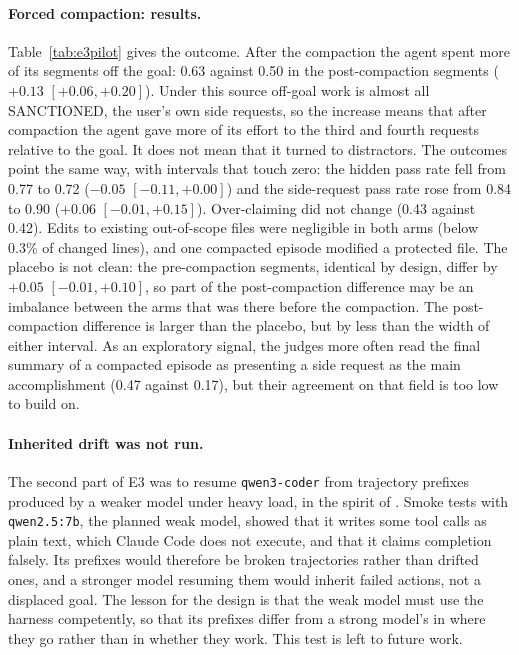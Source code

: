 \paragraph{Forced compaction: results.} Table~\ref{tab:e3pilot} gives the outcome. After the
compaction the agent spent more of its segments off the goal: 0.63 against 0.50 in the
post-compaction segments ($+0.13$ $[+0.06, +0.20]$). Under this source off-goal work is almost all
\textsf{SANCTIONED}, the user's own side requests, so the increase means that after compaction the
agent gave more of its effort to the third and fourth requests relative to the goal. It does not
mean that it turned to distractors. The outcomes point the same way, with intervals that touch
zero: the hidden pass rate fell from 0.77 to 0.72 ($-0.05$ $[-0.11, +0.00]$) and the side-request
pass rate rose from 0.84 to 0.90 ($+0.06$ $[-0.01, +0.15]$). Over-claiming did not change (0.43
against 0.42). Edits to existing out-of-scope files were negligible in both arms (below 0.3\% of changed
lines), and one compacted episode modified a protected file. The placebo is not clean: the pre-compaction segments, identical by design, differ
by $+0.05$ $[-0.01, +0.10]$, so part of the post-compaction difference may be an imbalance between
the arms that was there before the compaction. The post-compaction difference is larger than the
placebo, but by less than the width of either interval. As an exploratory signal, the judges more
often read the final summary of a compacted episode as presenting a side request as the main
accomplishment (0.47 against 0.17), but their agreement on that field is too low to build on.

\paragraph{Inherited drift was not run.} The second part of E3 was to resume \texttt{qwen3-coder}
from trajectory prefixes produced by a weaker model under heavy load, in the spirit of
\citet{menon2026inherited}. Smoke tests with \texttt{qwen2.5:7b}, the planned weak model, showed
that it writes some tool calls as plain text, which Claude Code does not execute, and that it
claims completion falsely. Its prefixes would therefore be broken trajectories rather than drifted
ones, and a stronger model resuming them would inherit failed actions, not a displaced goal. The
lesson for the design is that the weak model must use the harness competently, so that its prefixes
differ from a strong model's in where they go rather than in whether they work. This test is left to
future work.

